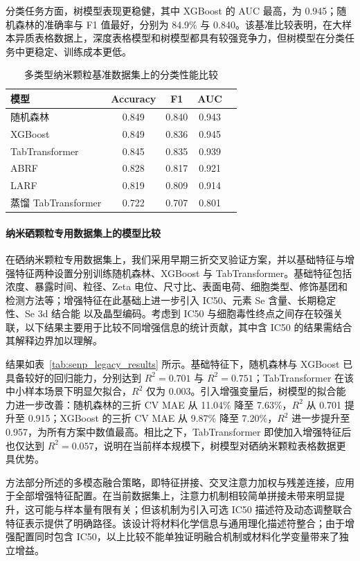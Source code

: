 分类任务方面，树模型表现更稳健，其中 XGBoost 的 AUC 最高，为 0.945；随机森林的准确率与 F1 值最好，分别为 84.9\% 与 0.840。该基准比较表明，在大样本异质表格数据上，深度表格模型和树模型都具有较强竞争力，但树模型在分类任务中更稳定、训练成本更低。

\begin{table}[htbp]
  \centering
  \caption{多类型纳米颗粒基准数据集上的分类性能比较}
  \label{tab:benchmark_classification}
  \begin{tabular}{lcccc}
    \hline
    模型 & Accuracy & F1 & AUC \\
    \hline
    随机森林 & 0.849 & 0.840 & 0.943 \\
    XGBoost & 0.849 & 0.836 & 0.945 \\
    TabTransformer & 0.845 & 0.835 & 0.939 \\
    ABRF & 0.828 & 0.817 & 0.921 \\
    LARF & 0.819 & 0.809 & 0.914 \\
    蒸馏 TabTransformer & 0.722 & 0.707 & 0.801 \\
    \hline
  \end{tabular}
\end{table}

\paragraph{纳米硒颗粒专用数据集上的模型比较}
在硒纳米颗粒专用数据集上，我们采用早期三折交叉验证方案，并以基础特征与增强特征两种设置分别训练随机森林、XGBoost 与 TabTransformer。基础特征包括浓度、暴露时间、粒径、Zeta 电位、尺寸比、表面电荷、细胞类型、修饰基团和检测方法等；增强特征在此基础上进一步引入 IC50、元素 Se 含量、长期稳定性、Se 3d 结合能 以及晶型编码。考虑到 IC50 与细胞毒性终点之间存在较强关联，以下结果主要用于比较不同增强信息的统计贡献，其中含 IC50 的结果需结合其解释边界加以理解。

结果如表~\ref{tab:senp_legacy_results} 所示。基础特征下，随机森林与 XGBoost 已具备较好的回归能力，分别达到 $R^2=0.701$ 与 $R^2=0.751$；TabTransformer 在该中小样本场景下明显欠拟合，$R^2$ 仅为 0.003。引入增强变量后，树模型的拟合能力进一步改善：随机森林的三折 CV MAE 从 11.04\% 降至 7.63\%，$R^2$ 从 0.701 提升至 0.915；XGBoost 的三折 CV MAE 从 9.87\% 降至 7.20\%，$R^2$ 进一步提升至 0.957，为所有方案中数值最高。相比之下，TabTransformer 即使加入增强特征后也仅达到 $R^2=0.057$，说明在当前样本规模下，树模型对硒纳米颗粒表格数据更具优势。

方法部分所述的多模态融合策略，即特征拼接、交叉注意力加权与残差连接，应用于全部增强特征配置。在当前数据集上，注意力机制相较简单拼接未带来明显提升，这可能与样本量有限有关；但该机制为引入可选 IC50 描述符及动态调整联合特征表示提供了明确路径。该设计将材料化学信息与通用理化描述符整合；由于增强配置同时包含 IC50，以上比较不能单独证明融合机制或材料化学变量带来了独立增益。


